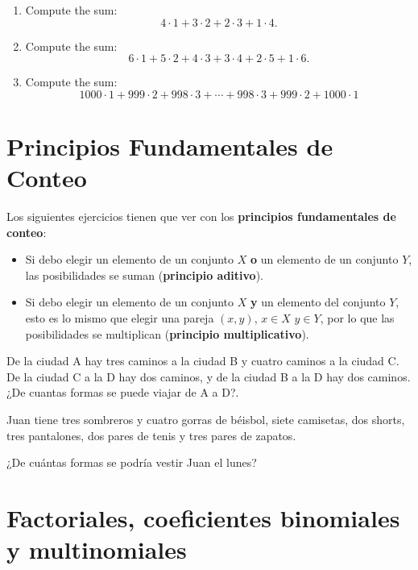 \begin{exercise}\begin{enumerate}
    \item Compute the sum: $$4\cdot 1+3\cdot 2+2\cdot 3 + 1\cdot4.$$
    \item Compute the sum: $$6\cdot 1+5\cdot 2+4\cdot 3 + 3\cdot4+ 2 \cdot 5 + 1 \cdot 6.$$
    \item Compute the sum: $$1000\cdot 1+999\cdot 2+998\cdot 3+ \cdots + 998\cdot3+ 999 \cdot 2 + 1000 \cdot 1$$
\end{enumerate}
\end{exercise}

\section{Principios Fundamentales de Conteo}

Los siguientes ejercicios tienen que ver con los {\bf principios fundamentales de conteo}: 
\begin{itemize}
    \item Si debo elegir un elemento de un conjunto $X$ {\bf o} un elemento de un conjunto $Y$, las posibilidades se suman ({\bf principio  aditivo}).
    \item Si debo elegir un elemento de un conjunto $X$ {\bf y} un elemento del conjunto $Y$, esto es lo mismo que elegir una pareja $(x,y)$, $x\in X$ $y\in Y$, por lo que las posibilidades se multiplican ({\bf principio multiplicativo}).
\end{itemize}

\begin{ejercicio}
De la ciudad A hay tres caminos a la ciudad B y cuatro caminos a la ciudad C. De la ciudad C a la D hay dos caminos, y de la ciudad B a la D hay dos caminos. ¿De cuantas formas se puede viajar de A a D?.
\end{ejercicio}
\vspace{4cm}

\begin{ejercicio}
Juan tiene tres sombreros y cuatro gorras de béisbol, siete camisetas, dos shorts, tres pantalones, dos pares de tenis y tres pares de zapatos.

¿De cuántas formas se podría vestir Juan el lunes?
\end{ejercicio}
\vspace{4cm}

\section{Factoriales, coeficientes binomiales y multinomiales}

